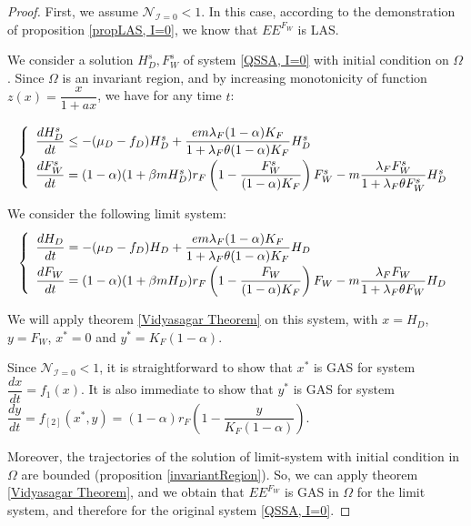 \documentclass{article}
\newcommand{\lfw}{\lambda_{F}}
\newcommand{\lfw}{\lambda_{F}}
\newcommand{\cI}{\mathcal{I}}
\begin{document}
\begin{proof}
First, we assume $\mathcal{N}_{\cI = 0} < 1$. In this case, according to the demonstration of proposition \ref{propLAS, I=0}, we know that $EE^{F_W}$ is LAS.

We consider a solution $H_D^s, F_W^s$ of system \eqref{QSSA, I=0} with initial condition on $\Omega$. Since $\Omega$ is an invariant region, and by increasing monotonicity of function $z(x) = \dfrac{x}{1 + a x}$, we have for any time $t$:

\begin{equation*}
\def\arraystretch{2}
\left\lbrace \begin{array}{l}
\dfrac{dH_D^s}{dt} \leq -(\mu_D - f_D) H_D^s + \dfrac{e m \lfw (1-\alpha) K_F}{1 + \lfw \theta (1-\alpha) K_F} H_D^s \\
\dfrac{dF_W^s}{dt} = (1-\alpha) (1+\beta m H_D^s) r_F \left(1 - \dfrac{F_W^s}{(1-\alpha)K_F} \right) F_W^s - m \dfrac{\lfw F_W^s}{1 + \lfw \theta F_W^s} H_D^s \\
\end{array} \right.
\end{equation*}

We consider the following limit system:
\begin{equation}
\def\arraystretch{2}
\left\lbrace \begin{array}{l}
\dfrac{dH_D}{dt} = -(\mu_D - f_D) H_D + \dfrac{e m \lfw (1-\alpha) K_F}{1 + \lfw \theta (1-\alpha) K_F} H_D \\
\dfrac{dF_W}{dt} = (1-\alpha) (1+\beta m H_D) r_F \left(1 - \dfrac{F_W}{(1-\alpha)K_F} \right) F_W - m \dfrac{\lfw F_W}{1 + \lfw \theta F_W} H_D \\
\end{array} \right.
\label{EEF, limit system}
\end{equation}

We will apply theorem \ref{Vidyasagar Theorem} on this system, with $x = H_D$, $y = F_W$, $x^* = 0$ and $y^* = K_F(1- \alpha)$.

Since $\mathcal{N}_{\cI = 0} < 1$, it is straightforward to show that $x^*$ is GAS for system $\dfrac{dx}{dt} = f_1(x)$. It is also immediate to show that $y^*$ is GAS for system $\dfrac{dy}{dt} = f_{[2]}(x^*, y) = (1-\alpha) r_F \left(1 - \dfrac{y}{K_F(1-\alpha)} \right) $. 

Moreover, the trajectories of the solution of limit-system \label{EEF, limit system} with initial condition in $\Omega$ are bounded (proposition \ref{invariantRegion}). So, we can apply theorem \ref{Vidyasagar Theorem}, and we obtain that $EE^{F_W}$ is GAS in $\Omega$ for the limit system, and therefore for the original system \eqref{QSSA, I=0}.


\end{proof}
\end{document}
